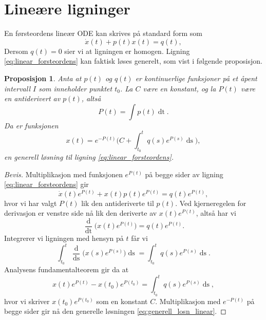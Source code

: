 \documentclass{article}
\theoremstyle{plain}
\newtheorem{prop}[thm]{Proposisjon}
\theoremstyle{definition}
\theoremstyle{remark}
\newcommand{\diff}[1]{\mathop{d#1}}
\newcommand{\fcn}{x}
\newcommand{\expfcn}[1]{e^{#1}}
\newcommand{\bigparanth}[1]{\big(#1\big)}
\newcommand{\biggparanth}[1]{\bigg(#1\bigg)}
\begin{document}
\section*{Lineære ligninger}

En førsteordens lineær ODE kan skrives på standard form som
\begin{equation} \label{eq:linear_forsteordens}
    \dot{\fcn}(t) + p(t) \fcn(t) = q(t),
\end{equation}
Dersom $q(t) = 0$ sier vi at ligningen er homogen. Ligning \eqref{eq:linear_forsteordens} kan faktisk løses generelt, som vist i følgende proposisjon.

\begin{prop} \label{prop:lineær_løsn}
    Anta at $p(t)$ og $q(t)$ er kontinuerlige funksjoner på et åpent intervall $I$ som inneholder punktet $t_0$. La $C$ være en konstant, og la $P(t)$ være en antiderivert av $p(t)$, altså
    \begin{equation*}
        P(t) = \int p(t) \diff{t}.
    \end{equation*}
    Da er funksjonen
    \begin{equation} \label{eq:generell_losn_linear}
        \fcn(t) = \expfcn{-P(t)} \biggparanth{ C + \int_{t_0}^t q(s) \expfcn{P(s)} \diff{s}},
    \end{equation}
    en generell løsning til ligning \eqref{eq:linear_forsteordens}.
\end{prop}

\begin{proof}[Bevis]
    Multiplikasjon med funksjonen $\expfcn{P(t)}$ på begge sider av ligning \eqref{eq:linear_forsteordens} gir
    \begin{equation*}
        \dot{\fcn}(t) \expfcn{P(t)} + \fcn(t) p(t) \expfcn{P(t)} = q(t) \expfcn{P(t)},
    \end{equation*}
    hvor vi har valgt $P(t)$ lik den antideriverte til $p(t)$. Ved kjerneregelen for derivasjon er venstre side nå lik den deriverte av $\fcn(t) \expfcn{P(t)}$, altså har vi
    \begin{equation*}
        \frac{\diff{}}{\diff{t}} \bigparanth{\fcn(t) \expfcn{P(t)}} = q(t) \expfcn{P(t)}.
    \end{equation*}
    Integrerer vi ligningen med hensyn på $t$ får vi
    \begin{equation*}
        \int_{t_0}^t \frac{\diff{}}{\diff{s}} \bigparanth{\fcn(s) \expfcn{P(s)}} \diff{s} = \int_{t_0}^{t} q(s) \expfcn{P(s)} \diff{s}.
    \end{equation*}
    Analysens fundamentalteorem gir da at
    \begin{equation*}
        \fcn(t) \expfcn{P(t)} - \fcn(t_0) \expfcn{P(t_0)} = \int_{t_0}^t q(s) \expfcn{P(s)} \diff{s},
    \end{equation*}
    hvor vi skriver $\fcn(t_0) \expfcn{P(t_0)}$ som en konstant $C$. Multiplikasjon med $\expfcn{-P(t)}$ på begge sider gir nå den generelle løsningen \eqref{eq:generell_losn_linear}.
\end{proof}
\end{document}
